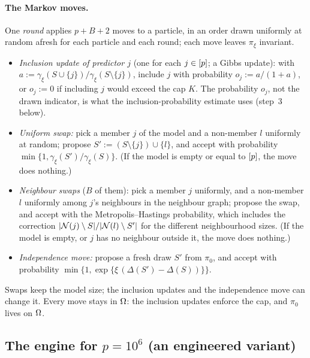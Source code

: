 \paragraph{The Markov moves.} One \emph{round} applies $p+B+2$ moves to a particle, in an order drawn uniformly at random
afresh for each particle and each round; each move leaves $\pi_\xi$ invariant.
\begin{itemize}[leftmargin=1.5em,itemsep=1pt]
  \item \emph{Inclusion update of predictor $j$} (one for each $j\in[p]$; a Gibbs update): with
    $a:=\gamma_\xi(S\cup\{j\})/\gamma_\xi(S\setminus\{j\})$, include $j$ with probability $o_j:=a/(1+a)$, or $o_j:=0$ if
    including $j$ would exceed the cap $K$. The probability $o_j$, not the drawn indicator, is what the inclusion-probability
    estimate uses (step~3 below).
  \item \emph{Uniform swap:} pick a member $j$ of the model and a non-member $l$ uniformly at random; propose
    $S':=(S\setminus\{j\})\cup\{l\}$, and accept with probability $\min\{1,\gamma_\xi(S')/\gamma_\xi(S)\}$. (If
    the model is empty or equal to $[p]$, the move does nothing.)
  \item \emph{Neighbour swaps} ($B$ of them): pick a member $j$ uniformly, and a non-member $l$ uniformly among $j$'s
    neighbours in the neighbour graph; propose the swap, and accept with the Metropolis--Hastings probability, which
    includes the correction $\lvert \mathcal N(j)\setminus S\rvert/\lvert \mathcal N(l)\setminus S'\rvert$ for the different
    neighbourhood sizes. (If the model is empty, or $j$ has no neighbour outside it, the move does nothing.)
  \item \emph{Independence move:} propose a fresh draw $S'$ from $\pi_0$, and accept with probability
    $\min\{1,\exp\{\xi\,(\Delta(S')-\Delta(S))\}\}$.
\end{itemize}
Swaps keep the model size; the inclusion updates and the independence move can change it. Every move stays in $\Omega$:
the inclusion updates enforce the cap, and $\pi_0$ lives on $\Omega$.


\subsection{The engine for \texorpdfstring{$p=10^6$}{p=10\^{}6} (an engineered variant)}\label{sec:supp-1m}


